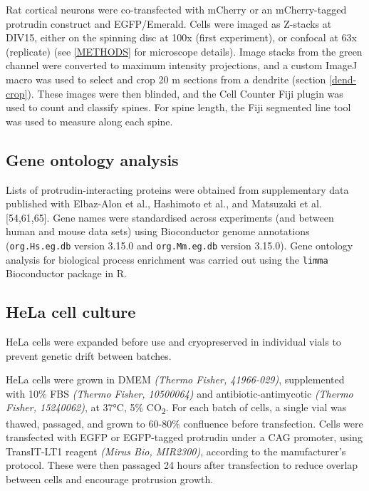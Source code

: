 \documentclass[
  12pt,
  a4paper,
]{book}
\begin{document}
Rat cortical neurons were co-transfected with mCherry or an mCherry-tagged protrudin construct and EGFP/Emerald. Cells were imaged as Z-stacks at DIV15, either on the spinning disc at 100x (first experiment), or confocal at 63x (replicate) (see \ref{METHODS} for microscope details). Image stacks from the green channel were converted to maximum intensity projections, and a custom ImageJ macro was used to select and crop 20 \textmu{}m sections from a dendrite (section \ref{dend-crop}). These images were then blinded, and the Cell Counter Fiji plugin was used to count and classify spines. For spine length, the Fiji segmented line tool was used to measure along each spine.

\subsection{Gene ontology analysis}\label{gene-ontology-analysis}

Lists of protrudin-interacting proteins were obtained from supplementary data published with Elbaz-Alon et al., Hashimoto et al., and Matsuzaki et al. {[}54,61,65{]}. Gene names were standardised across experiments (and between human and mouse data sets) using Bioconductor genome annotations (\texttt{org.Hs.eg.db} version 3.15.0 and \texttt{org.Mm.eg.db} version 3.15.0). Gene ontology analysis for biological process enrichment was carried out using the \texttt{limma} Bioconductor package in R.

\subsection{HeLa cell culture}\label{hela-cell-culture}

HeLa cells were expanded before use and cryopreserved in individual vials to prevent genetic drift between batches.

HeLa cells were grown in DMEM \emph{(Thermo Fisher, 41966-029)}, supplemented with 10\% FBS \emph{(Thermo Fisher, 10500064)} and antibiotic-antimycotic \emph{(Thermo Fisher, 15240062)}, at 37°C, 5\% CO\textsubscript{2}. For each batch of cells, a single vial was thawed, passaged, and grown to 60-80\% confluence before transfection. Cells were transfected with EGFP or EGFP-tagged protrudin under a CAG promoter, using TransIT-LT1 reagent \emph{(Mirus Bio, MIR2300)}, according to the manufacturer's protocol. These were then passaged 24 hours after transfection to reduce overlap between cells and encourage protrusion growth.
\end{document}
